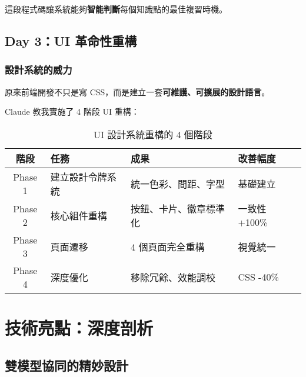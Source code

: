 \documentclass[11pt,a4paper]{article}
\begin{document}
這段程式碼讓系統能夠\textbf{智能判斷}每個知識點的最佳複習時機。

\subsection{Day 3：UI 革命性重構}

\subsubsection{設計系統的威力}

\begin{growth}
原來前端開發不只是寫 CSS，而是建立一套\textbf{可維護、可擴展的設計語言}。
\end{growth}

Claude 教我實施了 4 階段 UI 重構：

\begin{table}[ht]
\centering
\small
\begin{tabular}{|c|P{3cm}|P{3.5cm}|C{2cm}|}
\hline
{}
\textbf{階段} & \textbf{任務} & \textbf{成果} & \textbf{改善幅度} \\
\hline
Phase 1 & 建立設計令牌系統 & 統一色彩、間距、字型 & 基礎建立 \\
\hline
Phase 2 & 核心組件重構 & 按鈕、卡片、徽章標準化 & 一致性 +100\% \\
\hline
Phase 3 & 頁面遷移 & 4 個頁面完全重構 & 視覺統一 \\
\hline
Phase 4 & 深度優化 & 移除冗餘、效能調校 & CSS -40\% \\
\hline
\end{tabular}
\caption{UI 設計系統重構的 4 個階段}
\end{table}

\section{技術亮點：深度剖析}

\subsection{雙模型協同的精妙設計}
\end{document}
